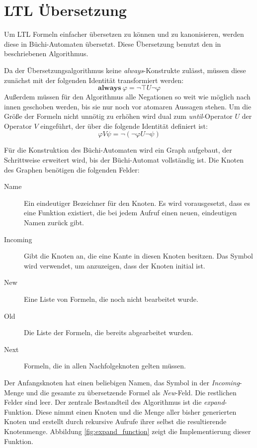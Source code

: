 \section{LTL Übersetzung}
\label{sec:ltl-translation}
Um LTL Formeln einfacher übersetzen zu können und zu kanonisieren, werden diese in Büchi-Automaten übersetzt.
Diese Übersetzung benutzt den in \cite{Gerth95simpleon-the-fly} beschriebenen Algorithmus.

Da der Übersetzungsalgorithmus keine \emph{always}-Konstrukte zulässt, müssen diese zunächst mit der folgenden Identität transformiert werden:
\[ \textbf{always}\ \varphi = \lnot\top U \lnot\varphi \]
Außerdem müssen für den Algorithmus alle Negationen so weit wie möglich nach innen geschoben werden, bis sie nur noch vor atomaren Aussagen stehen.
Um die Größe der Formeln nicht unnötig zu erhöhen wird dual zum \emph{until}-Operator $U$ der Operator $V$ eingeführt, der über die folgende Identität definiert ist:
\[ \varphi V\psi = \lnot (\lnot\varphi U\lnot\psi) \]

Für die Konstruktion des Büchi-Automaten wird ein Graph aufgebaut, der Schrittweise erweitert wird, bis der Büchi-Automat vollständig ist.
Die Knoten des Graphen benötigen die folgenden Felder:
\begin{description}
\item[Name] Ein eindeutiger Bezeichner für den Knoten.
  Es wird vorausgesetzt, dass es eine Funktion  existiert, die bei jedem Aufruf einen neuen, eindeutigen Namen zurück gibt.
\item[Incoming] Gibt die Knoten an, die eine Kante in diesen Knoten besitzen.
  Das Symbol  wird verwendet, um anzuzeigen, dass der Knoten initial ist.
\item[New] Eine Liste von Formeln, die noch nicht bearbeitet wurde.
\item[Old] Die Liste der Formeln, die bereits abgearbeitet wurden.
\item[Next] Formeln, die in allen Nachfolgeknoten gelten müssen.
\end{description}
Der Anfangsknoten hat einen beliebigen Namen, das Symbol  in der \emph{Incoming}-Menge und die gesamte zu übersetzende Formel als \emph{New}-Feld.
Die restlichen Felder sind leer.
Der zentrale Bestandteil des Algorithmus ist die \emph{expand}-Funktion.
Diese nimmt einen Knoten und die Menge aller bisher generierten Knoten und erstellt durch rekursive Aufrufe ihrer selbst die resultierende Knotenmenge.
Abbildung \ref{fig:expand_function} zeigt die Implementierung dieser Funktion.

